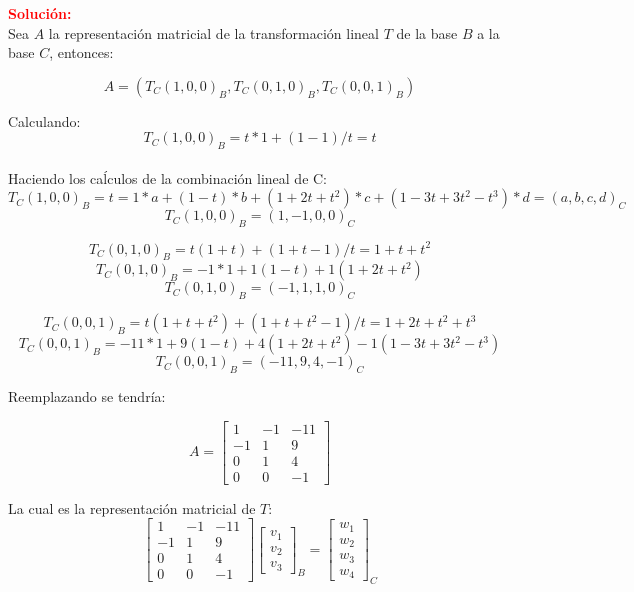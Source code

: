 \documentclass[12pt]{article}
\begin{document}
\noindent \textcolor{red}{\bf Solución:}\\

Sea $A$ la representación matricial de la transformación lineal $T$ de la base $B$ a la base $C$, entonces:

$$A=(T_{C}(1,0,0)_{B},T_{C}(0,1,0)_{B},T_{C}(0,0,1)_{B})$$

Calculando:\\

$$T_{C}(1,0,0)_{B} = t*1 + (1-1)/t = t$$\\
Haciendo los caĺculos de la combinación lineal de C:\\
$$T_{C}(1,0,0)_{B} = t = 1*a+(1-t)*b + (1+2t+t^2)*c+(1-3t+3t^2 - t^3)*d = (a,b,c,d)_C$$
$$T_{C}(1,0,0)_{B} = (1,-1,0,0)_{C}$$

$$T_{C}(0,1,0)_{B} = t(1+t) + (1+t-1)/t = 1 + t + t^2$$
$$T_{C}(0,1,0)_{B} = -1*1 + 1(1-t) + 1(1+2t+t^2)$$
$$T_{C}(0,1,0)_{B} = (-1,1,1,0)_{C}$$

$$T_{C}(0,0,1)_{B} = t(1+t+t^2) + (1+t+t^2-1)/t = 1 + 2t + t^2 + t^3$$
$$T_{C}(0,0,1)_{B} = -11*1 + 9(1-t) + 4(1+2t+t^2) -1(1-3t+3t^2-t^3)$$
$$T_{C}(0,0,1)_{B} = (-11,9,4,-1)_{C}$$

Reemplazando se tendría:

$$A=\left[\begin{array}{ccc}
        1&-1&-11\\
        -1&1&9\\
        0&1&4\\
        0&0&-1\end{array}\right]$$
        
La cual es la representación matricial de $T$:\\
        
$$\left[\begin{array}{ccc}
        1&-1&-11\\
        -1&1&9\\
        0&1&4\\
        0&0&-1\end{array}\right]
\left[\begin{array}{c}
        v_1\\
        v_2\\
        v_3\end{array}\right]_{B}=
\left[\begin{array}{c}
        w_1\\
        w_2\\
        w_3\\
        w_4\end{array}\right]_{C}$$
\end{document}
